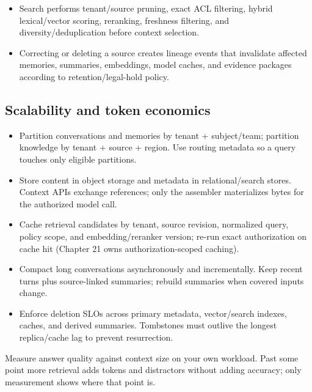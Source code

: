 \begin{itemize}

\item Search performs tenant/source pruning, exact ACL filtering, hybrid lexical/vector scoring, reranking, freshness filtering, and diversity/deduplication before context selection.

\item Correcting or deleting a source creates lineage events that invalidate affected memories, summaries, embeddings, model caches, and evidence packages according to retention/legal-hold policy.

\end{itemize}

\subsection{Scalability and token economics}

\begin{itemize}

\item Partition conversations and memories by tenant + subject/team; partition knowledge by tenant + source + region. Use routing metadata so a query touches only eligible partitions.

\item Store content in object storage and metadata in relational/search stores. Context APIs exchange references; only the assembler materializes bytes for the authorized model call.

\item Cache retrieval candidates by tenant, source revision, normalized query, policy scope, and embedding/reranker version; re-run exact authorization on cache hit (Chapter 21 owns authorization-scoped caching).

\item Compact long conversations asynchronously and incrementally. Keep recent turns plus source-linked summaries; rebuild summaries when covered inputs change.

\item Enforce deletion SLOs across primary metadata, vector/search indexes, caches, and derived summaries. Tombstones must outlive the longest replica/cache lag to prevent resurrection.

\end{itemize}

\begin{bookcost}
Measure answer quality against context size on your own workload. Past some point more retrieval adds tokens and distractors without adding accuracy; only measurement shows where that point is.
\end{bookcost}

